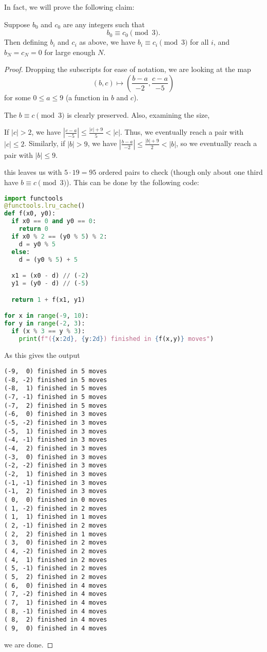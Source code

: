 \documentclass[11pt]{scrartcl}
\begin{document}
In fact, we will prove the following claim:
\begin{claim*}
  Suppose $b_0$ and $c_0$ are any integers such that
  \[ b_0 \equiv c_0 \pmod 3.\]
  Then defining $b_i$ and $c_i$ as above,
  we have $b_i \equiv c_i \pmod 3$ for all $i$,
  and $b_N = c_N = 0$ for large enough $N$.
\end{claim*}
\begin{proof}
Dropping the subscripts for ease of notation,
we are looking at the map
\[ (b, c) \mapsto \left( \frac{b-a}{-2},
    \frac{c-a}{-5} \right) \]
for some $0 \le a \le 9$ (a function in $b$ and $c$).

The $b \equiv c \pmod 3$ is clearly preserved.
Also, examining the size,
\begin{itemize}
  \ii If $|c| > 2$,
  we have $\left\lvert \frac{c-a}{-5} \right\rvert
  \le \frac{|c|+9}{5} < |c|$.
  Thus, we eventually reach a pair with $|c| \le 2$.
  \ii Similarly, if $|b| > 9$,
  we have $\left\lvert \frac{b-a}{-2} \right\rvert
  \le \frac{|b|+9}{2} < |b|$,
  so we eventually reach a pair with $|b| \le 9$.
\end{itemize}
this leaves us with $5 \cdot 19 = 95$ ordered pairs to check
(though only about one third have $b \equiv c \pmod 3$).
This can be done by the following code:
\begin{lstlisting}[language=Python]
import functools
@functools.lru_cache()
def f(x0, y0):
  if x0 == 0 and y0 == 0:
    return 0
  if x0 % 2 == (y0 % 5) % 2:
    d = y0 % 5
  else:
    d = (y0 % 5) + 5

  x1 = (x0 - d) // (-2)
  y1 = (y0 - d) // (-5)

  return 1 + f(x1, y1)

for x in range(-9, 10):
for y in range(-2, 3):
  if (x % 3 == y % 3):
    print(f"({x:2d}, {y:2d}) finished in {f(x,y)} moves")
\end{lstlisting}
As this gives the output
\begin{lstlisting}
(-9,  0) finished in 5 moves
(-8, -2) finished in 5 moves
(-8,  1) finished in 5 moves
(-7, -1) finished in 5 moves
(-7,  2) finished in 5 moves
(-6,  0) finished in 3 moves
(-5, -2) finished in 3 moves
(-5,  1) finished in 3 moves
(-4, -1) finished in 3 moves
(-4,  2) finished in 3 moves
(-3,  0) finished in 3 moves
(-2, -2) finished in 3 moves
(-2,  1) finished in 3 moves
(-1, -1) finished in 3 moves
(-1,  2) finished in 3 moves
( 0,  0) finished in 0 moves
( 1, -2) finished in 2 moves
( 1,  1) finished in 1 moves
( 2, -1) finished in 2 moves
( 2,  2) finished in 1 moves
( 3,  0) finished in 2 moves
( 4, -2) finished in 2 moves
( 4,  1) finished in 2 moves
( 5, -1) finished in 2 moves
( 5,  2) finished in 2 moves
( 6,  0) finished in 4 moves
( 7, -2) finished in 4 moves
( 7,  1) finished in 4 moves
( 8, -1) finished in 4 moves
( 8,  2) finished in 4 moves
( 9,  0) finished in 4 moves
\end{lstlisting}
we are done.
\end{proof}
\pagebreak
\end{document}
